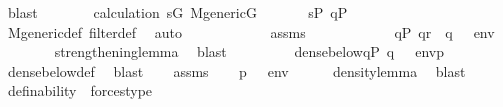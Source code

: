 \begin{isabellebody}
\ blast\isanewline
\ \ \ \ \isamarkupfalse%
\ \isamarkupfalse%
\ calculation\ {\isacartoucheopen}s{\isasymin}G{\isacartoucheclose}\ {\isacartoucheopen}M{\isacharunderscore}{\kern0pt}generic{\isacharparenleft}{\kern0pt}G{\isacharparenright}{\kern0pt}{\isacartoucheclose}\ \isanewline
\ \ \ \ \isamarkupfalse%
\ {\isachardoublequoteopen}s{\isasymin}P{\isachardoublequoteclose}\ {\isachardoublequoteopen}q{\isasymin}P{\isachardoublequoteclose}\ \isanewline
\ \ \ \ \ \ \isamarkupfalse%
\ M{\isacharunderscore}{\kern0pt}generic{\isacharunderscore}{\kern0pt}def\ filter{\isacharunderscore}{\kern0pt}def\ \isamarkupfalse%
\ auto\isanewline
\ \ \ \ \isamarkupfalse%
\ \isanewline
\ \ \ \ \isamarkupfalse%
\ assms\isanewline
\ \ \ \ \isamarkupfalse%
\ \isanewline
\ \ \ \ \isamarkupfalse%
\ {\isachardoublequoteopen}{\isasymexists}q{\isasymin}P{\isachardot}{\kern0pt}\ q{\isasympreceq}r\ {\isasymand}\ {\isacharparenleft}{\kern0pt}q\ {\isasymtturnstile}\ {\isasymphi}\ env{\isacharparenright}{\kern0pt}{\isachardoublequoteclose}\isanewline
\ \ \ \ \ \ \isamarkupfalse%
\ strengthening{\isacharunderscore}{\kern0pt}lemma\ \isamarkupfalse%
\ blast\isanewline
\ \ \isacommand{{\isacharbraceright}{\kern0pt}}\isamarkupfalse%
\isanewline
\ \ \isamarkupfalse%
\isanewline
\ \ \isamarkupfalse%
\ {\isachardoublequoteopen}dense{\isacharunderscore}{\kern0pt}below{\isacharparenleft}{\kern0pt}{\isacharbraceleft}{\kern0pt}q{\isasymin}P{\isachardot}{\kern0pt}\ {\isacharparenleft}{\kern0pt}q\ {\isasymtturnstile}\ {\isasymphi}\ env{\isacharparenright}{\kern0pt}{\isacharbraceright}{\kern0pt}{\isacharcomma}{\kern0pt}p{\isacharparenright}{\kern0pt}{\isachardoublequoteclose}\isanewline
\ \ \ \ \isamarkupfalse%
\ dense{\isacharunderscore}{\kern0pt}below{\isacharunderscore}{\kern0pt}def\ \isamarkupfalse%
\ blast\isanewline
\ \ \isamarkupfalse%
\ assms\isanewline
\ \ \isamarkupfalse%
\ {\isachardoublequoteopen}{\isacharparenleft}{\kern0pt}p\ {\isasymtturnstile}\ {\isasymphi}\ env{\isacharparenright}{\kern0pt}{\isachardoublequoteclose}\isanewline
\ \ \ \ \isamarkupfalse%
\ density{\isacharunderscore}{\kern0pt}lemma\ \isamarkupfalse%
\ blast\isanewline
{}\isamarkupfalse%
%
\endisatagproof
{\isafoldproof}%
%
\isadelimproof
\isanewline
%
\endisadelimproof
\isanewline
{}\isamarkupfalse%
\ definability\ {\isacharequal}{\kern0pt}\ forces{\isacharunderscore}{\kern0pt}type\ \isanewline
{}\isamarkupfalse%
\ \isanewline
%
\isadelimtheory
\isanewline
%
\endisadelimtheory
%
\isatagtheory
{}\isamarkupfalse%
%
\endisatagtheory
{\isafoldtheory}%
%
\isadelimtheory
%
\endisadelimtheory
%
\end{isabellebody}%
